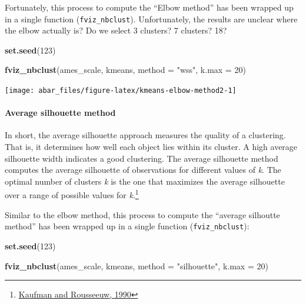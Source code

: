 \documentclass[]{book}
\newenvironment{Shaded}{\begin{snugshade}}{\end{snugshade}}
\newcommand{\DataTypeTok}[1]{\textcolor[rgb]{0.13,0.29,0.53}{#1}}
\newcommand{\DecValTok}[1]{\textcolor[rgb]{0.00,0.00,0.81}{#1}}
\newcommand{\KeywordTok}[1]{\textcolor[rgb]{0.13,0.29,0.53}{\textbf{#1}}}
\newcommand{\NormalTok}[1]{#1}
\newcommand{\StringTok}[1]{\textcolor[rgb]{0.31,0.60,0.02}{#1}}
\let\oldparagraph\paragraph
\renewcommand{\paragraph}[1]{\oldparagraph{#1}\mbox{}}
\let\rmarkdownfootnote\footnote%
\def\footnote{\protect\rmarkdownfootnote}
\theoremstyle{definition}
\theoremstyle{definition}
\theoremstyle{definition}
\theoremstyle{remark}
\begin{document}
Fortunately, this process to compute the ``Elbow method'' has been
wrapped up in a single function (\texttt{fviz\_nbclust}). Unfortunately,
the results are unclear where the elbow actually is? Do we select 3
clusters? 7 clusters? 18?

\begin{Shaded}
\begin{Highlighting}[]
\KeywordTok{set.seed}\NormalTok{(}\DecValTok{123}\NormalTok{)}

\KeywordTok{fviz_nbclust}\NormalTok{(ames_scale, kmeans, }\DataTypeTok{method =} \StringTok{"wss"}\NormalTok{, }\DataTypeTok{k.max =} \DecValTok{20}\NormalTok{)}
\end{Highlighting}
\end{Shaded}

\begin{center}\texttt{[image: abar\_files/figure-latex/kmeans-elbow-method2-1]} \end{center}

\hypertarget{silo}{%
\paragraph{Average silhouette method}\label{silo}}

In short, the average silhouette approach measures the quality of a
clustering. That is, it determines how well each object lies within its
cluster. A high average silhouette width indicates a good clustering.
The average silhouette method computes the average silhouette of
observations for different values of \emph{k}. The optimal number of
clusters \emph{k} is the one that maximizes the average silhouette over
a range of possible values for \emph{k}.\footnote{\href{http://onlinelibrary.wiley.com/book/10.1002/9780470316801}{Kaufman
  and Rousseeuw, 1990}}

Similar to the elbow method, this process to compute the ``average
silhoutte method'' has been wrapped up in a single function
(\texttt{fviz\_nbclust}):

\begin{Shaded}
\begin{Highlighting}[]
\KeywordTok{set.seed}\NormalTok{(}\DecValTok{123}\NormalTok{)}

\KeywordTok{fviz_nbclust}\NormalTok{(ames_scale, kmeans, }\DataTypeTok{method =} \StringTok{"silhouette"}\NormalTok{, }\DataTypeTok{k.max =} \DecValTok{20}\NormalTok{)}
\end{Highlighting}
\end{Shaded}
\end{document}
